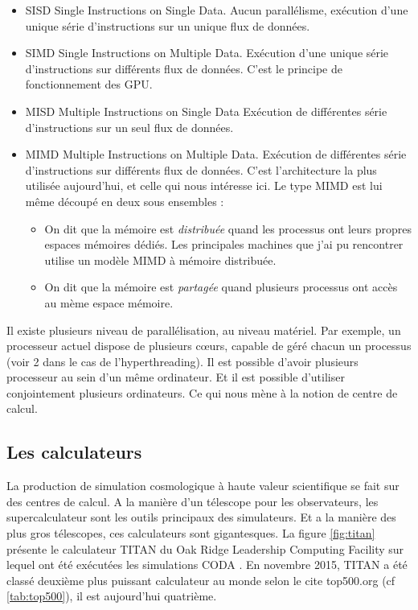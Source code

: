 \begin{itemize}
\item SISD Single Instructions on Single Data.
Aucun parallélisme, exécution d'une unique série d'instructions sur un unique flux de données.

\item SIMD Single Instructions on Multiple Data.
Exécution d'une unique série d'instructions sur différents flux de données.
C'est le principe de fonctionnement des GPU.

\item MISD Multiple Instructions on Single Data 
Exécution de différentes série d'instructions sur un seul flux de données.

\item MIMD Multiple Instructions on Multiple Data.
Exécution de différentes série d'instructions sur différents flux de données.
C'est l’architecture la plus utilisée aujourd'hui, et celle qui nous intéresse ici.
Le type MIMD est lui même découpé en deux sous ensembles : 

\begin{itemize}
\item On dit que la mémoire est \textit{distribuée} quand les processus ont leurs propres espaces mémoires dédiés.
Les principales machines que j'ai pu rencontrer utilise un modèle MIMD à mémoire distribuée.

\item On dit que la mémoire est \textit{partagée} quand plusieurs processus ont accès au mème espace mémoire.
\end{itemize}
\end{itemize}

Il existe plusieurs niveau de parallélisation, au niveau matériel.
Par exemple, un processeur actuel dispose de plusieurs cœurs, capable de géré chacun un processus (voir 2 dans le cas de l'hyperthreading).
Il est possible d'avoir plusieurs processeur au sein d'un même ordinateur.
Et il est possible d'utiliser conjointement plusieurs ordinateurs.
Ce qui nous mène à la notion de centre de calcul.

\subsection{Les calculateurs}

La production de simulation cosmologique à haute valeur scientifique se fait sur des centres de calcul.
A la manière d'un télescope pour les observateurs, les supercalculateur sont les outils principaux des simulateurs.
Et a la manière des plus gros télescopes, ces calculateurs sont gigantesques.
La figure \ref{fig:titan} présente le calculateur TITAN du Oak Ridge Leadership Computing Facility sur lequel ont été exécutées les simulations CODA \citep{ocvirk_cosmic_2015}.
En novembre 2015, TITAN a été classé deuxième plus puissant calculateur au monde selon le cite top500.org (cf \ref{tab:top500}), il est aujourd'hui quatrième.

